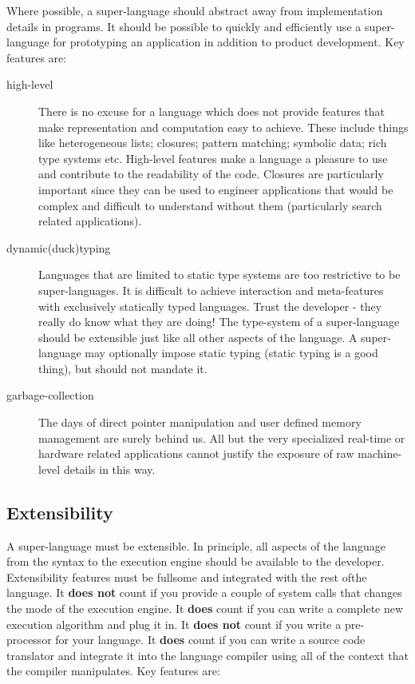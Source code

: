 Where possible, a super-language should abstract away from implementation
details in programs. It should be possible to quickly and efficiently
use a super-language for prototyping an application in addition to
product development. Key features are:

\begin{description}
\item [{high-level}] There is no excuse for a language which does not provide
features that make representation and computation easy to achieve.
These include things like heterogeneous lists; closures; pattern matching;
symbolic data; rich type systems etc. High-level features make a language
a pleasure to use and contribute to the readability of the code. Closures
are particularly important since they can be used to engineer applications
that would be complex and difficult to understand without them (particularly
search related applications).
\item [{dynamic(duck)typing}] Languages that are limited to static type
systems are too restrictive to be super-languages. It is difficult
to achieve interaction and meta-features with exclusively statically
typed languages. Trust the developer - they really do know what they
are doing! The type-system of a super-language should be extensible
just like all other aspects of the language. A super-language may
optionally impose static typing (static typing is a good thing), but
should not mandate it.
\item [{garbage-collection}] The days of direct pointer manipulation and
user defined memory management are surely behind us. All but the very
specialized real-time or hardware related applications cannot justify
the exposure of raw machine-level details in this way. 
\end{description}

\subsection{Extensibility}

A super-language must be extensible. In principle, all aspects of
the language from the syntax to the execution engine should be available
to the developer. Extensibility features must be fullsome and integrated
with the rest ofthe language. It \textbf{does not} count if you provide
a couple of system calls that changes the mode of the execution engine.
It \textbf{does} count if you can write a complete new execution algorithm
and plug it in. It \textbf{does not} count if you write a pre-processor
for your language. It \textbf{does} count if you can write a source
code translator and integrate it into the language compiler using
all of the context that the compiler manipulates. Key features are:

